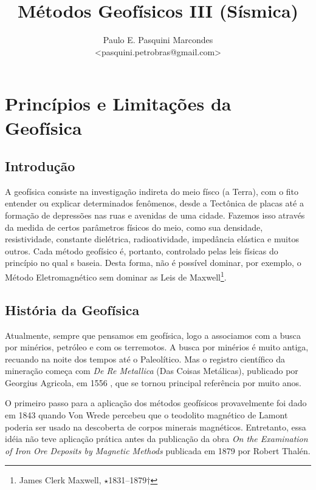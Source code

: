 \documentclass[a4paper,11pt]{scrbook}
\title{M\'etodos Geof\'isicos III (S\'ismica)}
\author{Paulo E. Pasquini Marcondes \\<pasquini.petrobras@gmail.com>}
\begin{document}
\maketitle


\chapter{Princ\'ipios e Limita\c{c}\~oes da Geof\'isica}

	\section{Introdu\c{c}\~ao}
A geof\'isica consiste na investiga\c{c}\~ao indireta do meio f\'isco (a Terra), com o fito entender ou explicar determinados fen\^omenos, desde a Tect\^onica de placas at\'e a forma\c{c}\~ao de depress\~oes nas ruas e avenidas de uma cidade.
Fazemos isso atrav\'es da medida de certos par\^ametros f\'isicos do meio, como sua densidade, resistividade, constante diel\'etrica, radioatividade, imped\^ancia el\'astica e muitos outros.
Cada m\'etodo geof\'isico \'e, portanto, controlado pelas leis f\'isicas do princ\'ipio no qual s baseia. Desta forma, n\~ao \'e poss\'ivel dominar, por exemplo, o M\'etodo Eletromagn\'etico sem dominar as Leis de Maxwell\footnote{James Clerk Maxwell, $\star$1831--1879$\dagger$}.

	\section{Hist\'oria da Geof\'isica}
Atualmente, sempre que pensamos em geof\'isica, logo a associamos com a busca por min\'erios, petr\'oleo e com os terremotos.
A busca por min\'erios \'e muito antiga, recuando na noite dos tempos at\'e o Paleol\'itico.
Mas o registro cient\'ifico da minera\c{c}\~ao come\c{c}a com \emph{De Re Metallica} (Das Coisas Met\'alicas), publicado por Georgius Agricola, em 1556 \citep{telford_1990}, que se tornou principal refer\^encia por muito anos.

O primeiro passo para a aplica\c{c}\~ao dos m\'etodos geof\'isicos provavelmente foi dado em 1843 quando Von Wrede percebeu que o teodolito magn\'etico de Lamont poderia ser usado na descoberta de corpos minerais magn\'eticos.
Entretanto, essa id\'eia n\~ao teve aplica\c{c}\~ao pr\'atica antes da publica\c{c}\~ao da obra \emph{On the Examination of Iron Ore Deposits by Magnetic Methods} publicada em 1879 por Robert Thal\'en.
\end{document}
